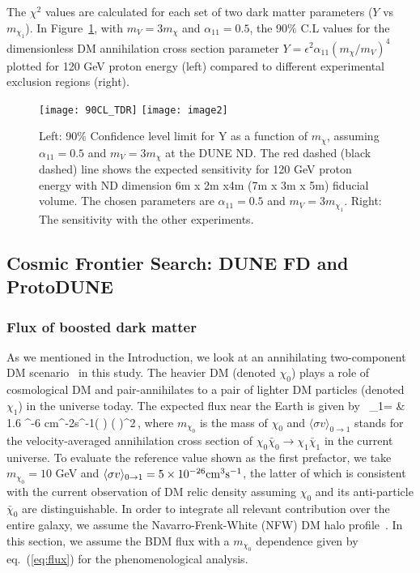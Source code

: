 
The $\chi^{2}$ values are calculated for each set of two dark matter parameters ($Y$ vs $m_{\chi_1}$).
In Figure~\ref{fig:chisq}, with $m_{V} = 3m_{\chi}$ and $\alpha_{11}=0.5$,  the 90$\%$ C.L  values for the dimensionless DM annihilation
cross section parameter $Y = \epsilon^{2}\alpha_{11} (m_{\chi}/m_{V})^4$ plotted for 120 GeV proton energy (left) compared to different experimental exclusion regions (right).
 \begin{figure}[t]
 \centering
 \texttt{[image: 90CL\_TDR]}
 \texttt{[image: image2]}
 \caption{\label{fig:chisq} Left: 90$\%$ Confidence level limit for Y as a function of $m_{\chi}$, assuming $\alpha_{11}=0.5$ and $m_{V} = 3m_{\chi}$ at the DUNE ND. 
The red dashed (black dashed) line shows the expected sensitivity for 120 GeV proton energy with ND dimension 6m x 2m x4m (7m x 3m x 5m) fiducial volume. 
The chosen parameters are $\alpha_{11}=0.5$ and $m_{V}= 3m_{\chi_1}$.
Right: The sensitivity with the other experiments.}
 \end{figure}

\subsection{Cosmic Frontier Search: DUNE FD and ProtoDUNE \label{sec:FD}}

\subsubsection{Flux of boosted dark matter \label{sec:flux}}

As we mentioned in the Introduction, we look at an annihilating two-component DM scenario~\cite{Belanger:2011ww} in this study. 
The heavier DM (denoted $\chi_0$) plays a role of cosmological DM and pair-annihilates to a pair of lighter DM particles (denoted $\chi_1$) in the universe today. 
The expected flux near the Earth is given by~\cite{Agashe:2014yua, Giudice:2017zke, Kim:2018veo}
\bea 
{}_1= & 1.6 ^{-6} {\rm cm}^{-2}{\rm s}^{-1}\times \left( \right) 
 \times \left( \right)^2\,,
\label{eq:flux}
\eea
where $m_{\chi_0}$ is the mass of $\chi_0$ and $\langle \sigma v\rangle_{0\rightarrow 1}$ stands for the velocity-averaged annihilation cross section of $\chi_0\bar{\chi}_0 \to \chi_1\bar{\chi}_1$ in the current universe.
To evaluate the reference value shown as the first prefactor, we take $m_{\chi_0} = 10$ GeV and $\langle \sigma v\rangle_{0\rightarrow 1}=5\times 10^{-26}{\rm cm}^3{\rm s}^{-1}$, the latter of which is consistent with the current observation of DM relic density assuming $\chi_0$ and its anti-particle $\bar{\chi}_0$ are distinguishable. 
In order to integrate all relevant contribution over the entire galaxy, we assume the Navarro-Frenk-White (NFW) DM halo profile~\cite{Navarro:1995iw, Navarro:1996gj}.
In this section, we assume the BDM flux with a $m_{\chi_0}$ dependence given by eq.~(\ref{eq:flux}) for the phenomenological analysis. 


